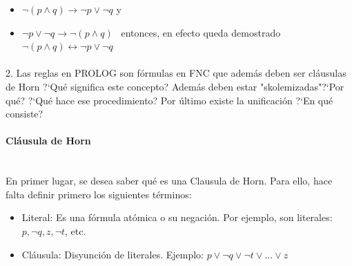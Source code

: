 \documentclass{article}
\begin{document}
\begin{itemize}
Ahora se demostrar\'a $\neg p \lor \neg q \rightarrow \neg (p \land q)$
\[
\begin{nd}
\hypo {1} {\neg p \lor \neg q} 
\open
\hypo {2} {\neg p}
\open
\hypo {3} {p \land q }
\have {4} {p} \ae{3}
\have {5} {\neg p} \r{2}
\have {6} {p \land \neg p,  \bot} \ai{4,5}
\close
\have {7} {\neg (p \land q) } \ni{6}
\close
\open
\hypo {8} {\neg q}
\open
\hypo {9} {p \land q }
\have {10} {q} \ae{9}
\have {11} {q \land \neg q,  \bot} \ai{9,10}
\close
\have {12} {\neg (p \land q) } \ni{11}
\close
\have {13} {\neg (p \land q) } \oe{1,7,12}
\close
\have {14} {(\neg p \lor \neg q) \rightarrow \neg (p \land q) } \ii{1,13}
\end{nd}
\]
		
Como se demostr\'o que se cumple: \
\item $\neg (p \land q) \rightarrow \neg p \lor \neg q$ y \
\item $\neg p \lor \neg q \rightarrow \neg (p \land q)$ \
entonces, en efecto queda demostrado
$\neg (p \land q) \leftrightarrow \neg p \lor \neg q$
\end{itemize}

\paragraph{}

2. Las reglas en PROLOG son f\'ormulas en FNC que adem\'as deben ser cl\'ausulas de Horn ?`Qu\'e significa este concepto? Adem\'as deben estar "skolemizadas"?`Por qu\'e? ?`Qu\'e hace ese procedimiento? Por \'ultimo existe la unificaci\'on ?`En qu\'e consiste?

\paragraph{Cl\'ausula de Horn}\mbox{}\\

En primer lugar, se desea saber qu\'e es una Clausula de Horn. Para ello, hace falta definir primero los siguientes t\'erminos:

\begin{itemize}

\item Literal: Es una f\'ormula at\'omica o su negaci\'on. Por ejemplo, son literales: $p, \neg q, z, \neg t$, etc.
\item Cl\'ausula: Disyunci\'on de literales. Ejemplo: $ p \lor \neg q \lor \neg t \lor ... \lor z $ 

\end{itemize}
\end{document}
